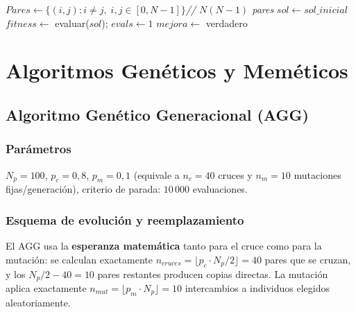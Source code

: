 \documentclass[12pt,a4paper]{article}
\begin{document}
\begin{algorithm}[H]
\caption{BL($sol\_inicial$, problema, maxEvals, $p=0{,}15$)}
$Pares \leftarrow \{(i,j) : i \neq j,\; i,j \in [0,N-1]\}$\quad \textit{// $N(N-1)$ pares}\;
$sol \leftarrow sol\_inicial$\;
$fitness \leftarrow$ evaluar($sol$); $evals \leftarrow 1$\;
$mejora \leftarrow$ verdadero\;
\end{algorithm}

\section{Algoritmos Genéticos y Meméticos}

\subsection{Algoritmo Genético Generacional (AGG)}

\subsubsection*{Parámetros}
$N_p=100$, $p_c=0{,}8$, $p_m=0{,}1$ (equivale a $n_c=40$ cruces y $n_m=10$ mutaciones fijas/generación), criterio de parada: $10\,000$ evaluaciones.

\subsubsection*{Esquema de evolución y reemplazamiento}

El AGG usa la \textbf{esperanza matemática} tanto para el cruce como para la mutación:
se calculan exactamente $n_{cruces} = \lfloor p_c \cdot N_p / 2 \rfloor = 40$ pares que
se cruzan, y los $N_p/2 - 40 = 10$ pares restantes producen copias directas. La mutación
aplica exactamente $n_{mut} = \lfloor p_m \cdot N_p \rfloor = 10$ intercambios a
individuos elegidos aleatoriamente.
\end{document}
